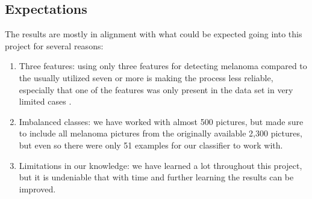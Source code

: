 \subsection{Expectations}
The results are mostly in alignment with what could be expected going into this project for several reasons:
\begin{enumerate}
    \item Three features: using only three features for detecting melanoma compared to the usually utilized seven or more is making the process less reliable, especially that one of the features was only present in the data set in very limited cases \cite{seven-pointchecklist}.\
    \item Imbalanced classes: we have worked with almost 500 pictures, but made sure to include all melanoma pictures from the originally available 2,300 pictures, but even so there were only 51 examples for our classifier to work with.\
    \item Limitations in our knowledge: we have learned a lot throughout this project, but it is undeniable that with time and further learning the results can be improved.
\end{enumerate}


